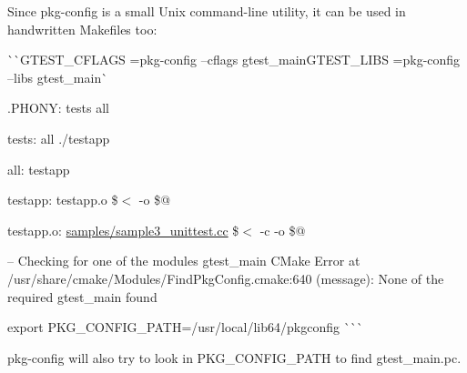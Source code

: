Since {\ttfamily pkg-\/config} is a small Unix command-\/line utility, it can be used in handwritten {\ttfamily Makefile}s too\+:

\`{}\`{}{\ttfamily  G\+T\+E\+S\+T\+\_\+\+C\+F\+L\+A\+GS =}pkg-\/config --cflags gtest\+\_\+main{\ttfamily  G\+T\+E\+S\+T\+\_\+\+L\+I\+BS =}pkg-\/config --libs gtest\+\_\+main\`{}

.P\+H\+O\+NY\+: tests all

tests\+: all ./testapp

all\+: testapp

testapp\+: testapp.\+o    \$$<$ -\/o \$@ 

testapp.\+o\+: \mbox{\hyperlink{sample3__unittest_8cc}{samples/sample3\+\_\+unittest.\+cc}}    \$$<$ -\/c -\/o \$@  
\begin{DoxyCode}{0}
\DoxyCodeLine{}
\end{DoxyCode}
 -- Checking for one of the modules \textquotesingle{}gtest\+\_\+main\textquotesingle{} C\+Make Error at /usr/share/cmake/\+Modules/\+Find\+Pkg\+Config.cmake\+:640 (message)\+: None of the required \textquotesingle{}gtest\+\_\+main\textquotesingle{} found 
\begin{DoxyCode}{0}
\end{DoxyCode}
 export P\+K\+G\+\_\+\+C\+O\+N\+F\+I\+G\+\_\+\+P\+A\+TH=/usr/local/lib64/pkgconfig \`{}\`{}\`{}

pkg-\/config will also try to look in {\ttfamily P\+K\+G\+\_\+\+C\+O\+N\+F\+I\+G\+\_\+\+P\+A\+TH} to find {\ttfamily gtest\+\_\+main.\+pc}. 